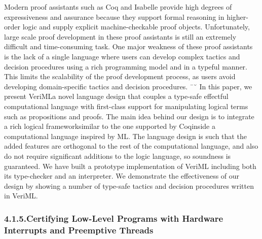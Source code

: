 \documentclass[12pt,twoside]{article}
\begin{document}
Modern proof assistants such as Coq and Isabelle provide high degrees
of expressiveness and assurance because they support formal reasoning
in higher-order logic and supply explicit machine-checkable proof
objects. Unfortunately, large scale proof development in these proof
assistants is still an extremely difficult and time-consuming
task. One major weakness of these proof assistants is the lack of a
single language where users can develop complex tactics and decision
procedures using a rich programming model and in a typeful
manner. This limits the scalability of the proof development process,
as users avoid developing domain-specific tactics and decision
procedures.
¯˘
In this paper, we present VeriML\textemdash{}a novel language design that
couples a type-safe effectful computational language with first-class
support for manipulating logical terms such as propositions and
proofs. The main idea behind our design is to integrate a rich logical
framework\textemdash{}similar to the one supported by Coq\textemdash{}inside a
computational language inspired by ML. The language design is such
that the added features are orthogonal to the rest of the
computational language, and also do not require significant additions
to the logic language, so soundness is guaranteed. We have built a
prototype implementation of VeriML including both its type-checker and
an interpreter. We demonstrate the effectiveness of our design by
showing a number of type-safe tactics and decision procedures written
in VeriML.%

\subsubsection{4.1.5.\hspace*{0.5em}Certifying Low-Level Programs with Hardware Interrupts and Preemptive Threads}\label{sec-certifying-low-level-programs-with-hardware-interrupts-and-preemptive-threads}%
\end{document}
